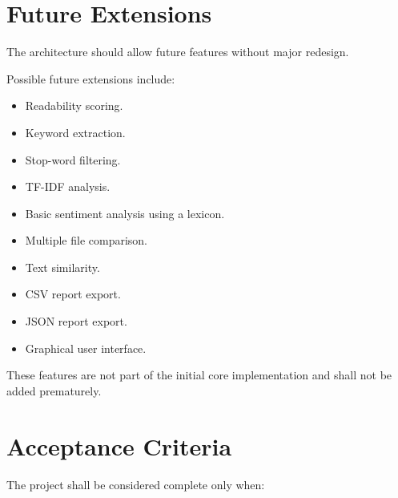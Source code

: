 \documentclass[12pt,a4paper]{article}
\begin{document}
\section{Future Extensions}

The architecture should allow future features without major redesign.

Possible future extensions include:

\begin{itemize}
    \item Readability scoring.
    \item Keyword extraction.
    \item Stop-word filtering.
    \item TF-IDF analysis.
    \item Basic sentiment analysis using a lexicon.
    \item Multiple file comparison.
    \item Text similarity.
    \item CSV report export.
    \item JSON report export.
    \item Graphical user interface.
\end{itemize}

These features are not part of the initial core implementation and
shall not be added prematurely.


\section{Acceptance Criteria}

The project shall be considered complete only when:
\end{document}
